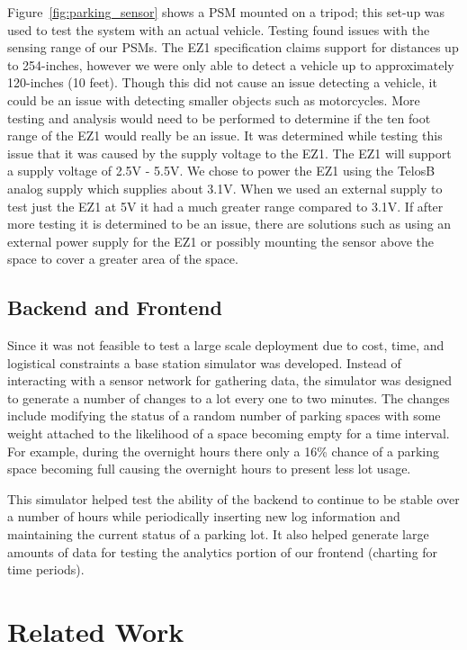 \documentclass{acm_proc}
\begin{document}
Figure~\ref{fig:parking_sensor} shows a PSM mounted on a tripod; this
set-up was used to test the system with an actual vehicle.
Testing found issues with the sensing range of our PSMs.
The EZ1 specification claims support for distances up to 254-inches,
however we were only able to detect a vehicle up to approximately
120-inches (10 feet).
Though this did not cause an issue detecting a vehicle, it could be an
issue with detecting smaller objects such as motorcycles.
More testing and analysis would need to be performed to determine if the
ten foot range of the EZ1 would really be an issue.
It was determined while testing this issue that it was caused by the supply
voltage to the EZ1.
The EZ1 will support a supply voltage of 2.5V - 5.5V.
We chose to power the EZ1 using the TelosB analog supply which
supplies about 3.1V.
When we used an external supply to test just the EZ1 at 5V it had a much
greater range compared to 3.1V.
If after more testing it is determined to be an issue, there are solutions
such as using an external power supply for the EZ1 or possibly mounting the
sensor above the space to cover a greater area of the space. 

\subsection{Backend and Frontend}

Since it was not feasible to test a large scale deployment due to cost,
time, and logistical constraints a base station simulator was developed.
Instead of interacting with a sensor network for gathering data, the
simulator was designed to generate a number of changes to a lot every one
to two minutes.
The  changes include modifying the status of a random number of parking
spaces with some weight attached to the likelihood of a space becoming empty
for a time interval.
For example, during the overnight hours there only a 16\% chance of a
parking space becoming full causing the overnight hours to present less lot
usage.

This simulator helped test the ability of the backend to continue to be
stable over a number of hours while periodically inserting new log
information and maintaining the current status of a parking lot.
It also helped generate large amounts of data for testing the analytics
portion of our frontend (charting for time periods).

\section{Related Work}\label{sec:related}
\end{document}
